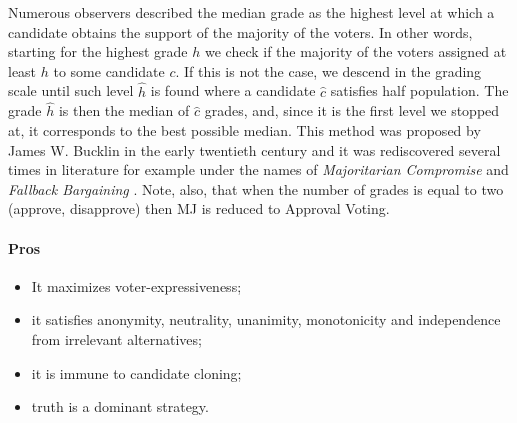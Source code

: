 Numerous observers described the median grade as the highest level at which a candidate obtains the support of the majority of the voters. In other words, starting for the highest grade $h$ we check if the majority of the voters assigned at least $h$ to some candidate $c$. If this is not the case, we descend in the grading scale until such level $\hat{h}$ is found where a candidate $\hat{c}$ satisfies half population. The grade $\hat{h}$ is then the median of $\hat{c}$ grades, and, since it is the first level we stopped at, it corresponds to the best possible median. This method was proposed by James W. Bucklin in the early twentieth century \citep{Hoag1926} and it was rediscovered several times in literature for example under the names of \textit{Majoritarian Compromise} \citep{Sertel1986,Sertel1999} and \textit{Fallback Bargaining} \citep{Brams2001}. Note, also, that when the number of grades is equal to two (approve, disapprove) then \ac{MJ} is reduced to Approval Voting.

\paragraph{Pros}
\begin{itemize}
	\item It maximizes voter-expressiveness;
	\item it satisfies anonymity, neutrality, unanimity, monotonicity and independence from irrelevant alternatives;
	\item it is immune to candidate cloning;
	\item truth is a dominant strategy.
\end{itemize}

